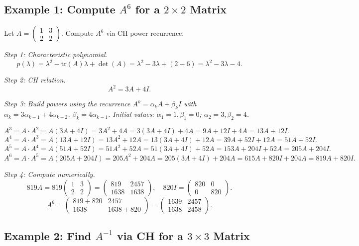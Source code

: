 \documentclass[12pt,a4paper]{article}
\begin{document}
\subsection*{Example 1: Compute \(A^6\) for a \(2\times 2\) Matrix}

Let \(A = \begin{pmatrix}1 & 3 \\ 2 & 2\end{pmatrix}\). Compute \(A^6\) via CH power recurrence.

\textit{Step 1: Characteristic polynomial.}
\[
  p(\lambda) = \lambda^2 - \text{tr}(A)\lambda + \det(A) = \lambda^2 - 3\lambda + (2 - 6) = \lambda^2 - 3\lambda - 4.
\]

\textit{Step 2: CH relation.}
\[
  A^2 = 3A + 4I.
\]

\textit{Step 3: Build powers using the recurrence \(A^k = \alpha_k A + \beta_k I\)
with \(\alpha_k = 3\alpha_{k-1} + 4\alpha_{k-2}\), \(\beta_k = 4\alpha_{k-1}\).
Initial values: \(\alpha_1 = 1, \beta_1 = 0\); \(\alpha_2 = 3, \beta_2 = 4\).}

\[
  A^3 = A \cdot A^2 = A(3A+4I) = 3A^2+4A = 3(3A+4I)+4A = 9A+12I+4A = 13A+12I.
\]
\[
  A^4 = A \cdot A^3 = A(13A+12I) = 13A^2+12A = 13(3A+4I)+12A = 39A+52I+12A = 51A+52I.
\]
\[
  A^5 = A \cdot A^4 = A(51A+52I) = 51A^2+52A = 51(3A+4I)+52A = 153A+204I+52A = 205A+204I.
\]
\[
  A^6 = A \cdot A^5 = A(205A+204I) = 205A^2+204A = 205(3A+4I)+204A = 615A+820I+204A = 819A+820I.
\]

\textit{Step 4: Compute numerically.}
\[
  819A = 819\begin{pmatrix}1&3\\2&2\end{pmatrix} = \begin{pmatrix}819&2457\\1638&1638\end{pmatrix},
  \quad 820I = \begin{pmatrix}820&0\\0&820\end{pmatrix}.
\]
\[
  A^6 = \begin{pmatrix}819+820 & 2457 \\ 1638 & 1638+820\end{pmatrix} = \begin{pmatrix}1639 & 2457 \\ 1638 & 2458\end{pmatrix}.
\]

\subsection*{Example 2: Find \(A^{-1}\) via CH for a \(3\times 3\) Matrix}
\end{document}
